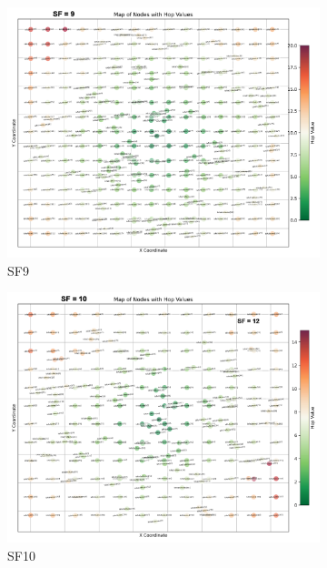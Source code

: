\begin{figure}[ht!]
    \begin{subfigure}{0.45\linewidth}
        \includegraphics[width=\linewidth]{images/nodeplacement3.png}
        \caption{SF9}
    \end{subfigure}
   \hfill
    \begin{subfigure}{0.45\linewidth}
        \includegraphics[width=\linewidth]{images/nodeplacement4.png}
        \caption{SF10}
    \end{subfigure}
    \\
    \begin{subfigure}{0.45\linewidth}

\end{subfigure}
\end{figure}
